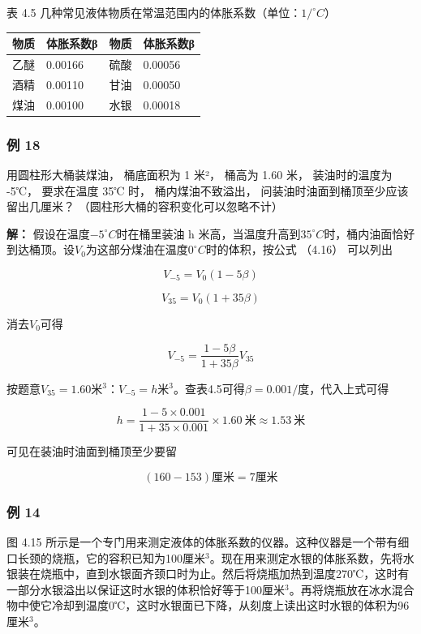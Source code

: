 表 4.5 几种常见液体物质在常温范围内的体胀系数（单位：\(1/^{\circ}C\)）

{\def\LTcaptype{none} %
\begin{longtable}[]{@{}llll@{}}
\toprule\noalign{}
物质 & 体胀系数β & 物质 & 体胀系数β \\
\midrule\noalign{}
\endhead
\bottomrule\noalign{}
\endlastfoot
乙醚 & 0.00166 & 硫酸 & 0.00056 \\
酒精 & 0.00110 & 甘油 & 0.00050 \\
煤油 & 0.00100 & 水银 & 0.00018 \\
\end{longtable}
}

\subsubsection{例 18}\label{ux4f8b-18}

用圆柱形大桶装煤油， 桶底面积为 1 米²， 桶高为 1.60 米， 装油时的温度为
-5℃， 要求在温度 35℃ 时， 桶内煤油不致溢出，
问装油时油面到桶顶至少应该留出几厘米？
（圆柱形大桶的容积变化可以忽略不计）

\textbf{解：} 假设在温度\(-5^{\circ}C\)时在桶里装油 h
米高，当温度升高到\(35^{\circ}C\)时，桶内油面恰好到达桶顶。设\(V_{0}\)为这部分煤油在温度\(0^{\circ}C\)时的体积，按公式
（4.16） 可以列出

\[
V _ {- 5} = V _ {0} (1 - 5 \beta)
\]

\[
V_{35}=V_0(1+35\beta)
\]

消去\(V_{0}\)可得

\[
V _ {- 5} = \frac {1 - 5 \beta}{1 + 35 \beta} V _ {35}
\]

按题意\(V_{35} = 1.60\)米\(^3\)：\(V_{-5} = h\)米\(^3\)。查表4.5可得\(\beta = 0.001/\)度，代入上式可得

\[
h=\frac{1-5\times0.001}{1+35\times0.001}\times1.60\ \text{米}\approx1.53\ \text{米}
\]

可见在装油时油面到桶顶至少要留

\[
(160 - 153) \text{厘米} = 7 \text{厘米}
\]

\subsubsection{例 14}\label{ux4f8b-14}

图 4.15
所示是一个专门用来测定液体的体胀系数的仪器。这种仪器是一个带有细口长颈的烧瓶，它的容积已知为100厘米\(^3\)。现在用来测定水银的体胀系数，先将水银装在烧瓶中，直到水银面齐颈口时为止。然后将烧瓶加热到温度270℃，这时有一部分水银溢出以保证这时水银的体积恰好等于100厘米\(^{3}\)。再将烧瓶放在冰水混合物中使它冷却到温度0℃，这时水银面已下降，从刻度上读出这时水银的体积为96厘米\(^{3}\)。

